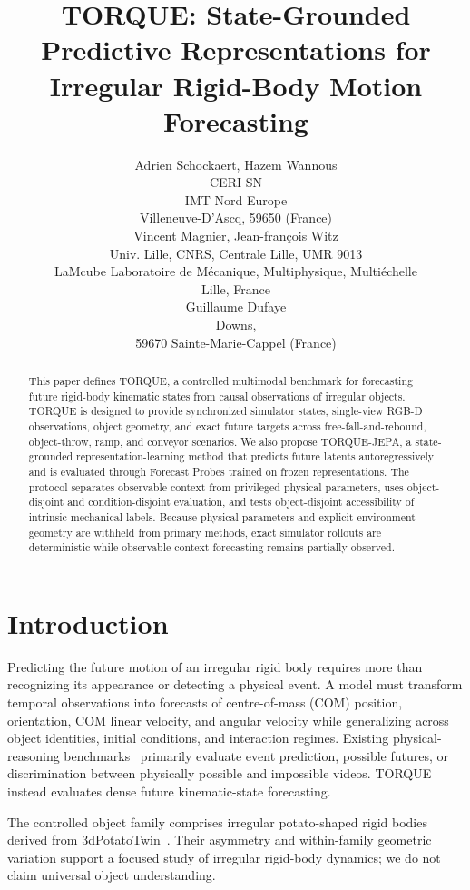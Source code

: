\documentclass{article}
\title{TORQUE: State-Grounded Predictive Representations for Irregular Rigid-Body Motion Forecasting}
\author{Adrien Schockaert, Hazem Wannous \\
CERI SN \\
IMT Nord Europe \\
Villeneuve-D'Ascq, 59650 (France) \\
\And Vincent Magnier, Jean-françois Witz \\
Univ. Lille, CNRS, Centrale Lille, UMR 9013 \\
LaMcube Laboratoire de Mécanique, Multiphysique, Multiéchelle \\
Lille, France \\
\And Guillaume Dufaye \\
Downs, \\
59670 Sainte-Marie-Cappel (France)
}
\begin{document}
\maketitle

\begin{abstract}
This paper defines TORQUE, a controlled multimodal benchmark for forecasting future rigid-body kinematic states from causal observations of irregular objects. TORQUE is designed to provide synchronized simulator states, single-view RGB-D observations, object geometry, and exact future targets across free-fall-and-rebound, object-throw, ramp, and conveyor scenarios. We also propose TORQUE-JEPA, a state-grounded representation-learning method that predicts future latents autoregressively and is evaluated through Forecast Probes trained on frozen representations. The protocol separates observable context from privileged physical parameters, uses object-disjoint and condition-disjoint evaluation, and tests object-disjoint accessibility of intrinsic mechanical labels. Because physical parameters and explicit environment geometry are withheld from primary methods, exact simulator rollouts are deterministic while observable-context forecasting remains partially observed.
\end{abstract}

\section{Introduction}

Predicting the future motion of an irregular rigid body requires more than recognizing its appearance or detecting a physical event. A model must transform temporal observations into forecasts of centre-of-mass (COM) position, orientation, COM linear velocity, and angular velocity while generalizing across object identities, initial conditions, and interaction regimes. Existing physical-reasoning benchmarks~\cite{riochet_intphys_2020,bordes_intphys_2025,bear_physion_2022,tung_physion_2023,yi_clevrer_2020} primarily evaluate event prediction, possible futures, or discrimination between physically possible and impossible videos. TORQUE instead evaluates dense future kinematic-state forecasting.

The controlled object family comprises irregular potato-shaped rigid bodies derived from 3dPotatoTwin~\cite{blok_high-throughput_2025}. Their asymmetry and within-family geometric variation support a focused study of irregular rigid-body dynamics; we do not claim universal object understanding.
\end{document}
